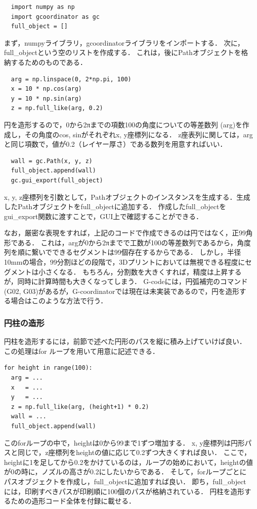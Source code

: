 \documentclass{article}
\begin{document}
\begin{twocolumn}
\begin{lstlisting}
  import numpy as np
  import gcoordinator as gc
  full_object = []
\end{lstlisting}

まず，numpyライブラリ，gcoordinatorライブラリをインポートする．
次に，full\_objectという空のリストを作成する．
これは，後にPathオブジェクトを格納するためのものである．

\begin{lstlisting}
  arg = np.linspace(0, 2*np.pi, 100)
  x = 10 * np.cos(arg)
  y = 10 * np.sin(arg)
  z = np.full_like(arg, 0.2)
\end{lstlisting}

円を造形するので，0から2πまでの項数100の角度についての等差数列
(arg)を作成し，その角度のcos, sinがそれぞれx, y座標列になる．
z座表列に関しては，argと同じ項数で，値が0.2（レイヤー厚さ）である数列を用意すればいい．

\begin{lstlisting}
  wall = gc.Path(x, y, z)
  full_object.append(wall)
  gc.gui_export(full_object)
\end{lstlisting}

x, y, z座標列を引数として，Pathオブジェクトのインスタンスを生成する．生成したPathオブジェクトをfull\_objectに追加する．
作成したfull\_objectをgui\_export関数に渡すことで，GUI上で確認することができる．

なお，厳密な表現をすれば，上記のコードで作成できるのは円ではなく，正99角形である．
これは，argが0から2πまでで工数が100の等差数列であるから，角度列を順に繋いでできるセグメントは99個存在するからである．
しかし，半径10mmの場合，99分割ほどの段階で，3Dプリントにおいては無視できる程度にセグメントは小さくなる．
もちろん，分割数を大きくすれば，精度は上昇するが，同時に計算時間も大きくなってしまう．
G-codeには，円弧補完のコマンド(G02, G03)があるが，G-coordinatorでは現在は未実装であるので，円を造形する場合はこのような方法で行う．

\subsubsection{円柱の造形}
円柱を造形するには，前節で述べた円形のパスを縦に積み上げていけば良い．
この処理はfor ループを用いて用意に記述できる．
\begin{lstlisting}[breaklines=false]
for height in range(100):
  arg = ...
  x   = ...
  y   = ...
  z = np.full_like(arg, (height+1) * 0.2)
  wall = ...
  full_object.append(wall)
\end{lstlisting}
このforループの中で，heightは0から99まで1ずつ増加する．
x, y座標列は円形パスと同じで，z座標列をheightの値に応じて0.2ずつ大きくすれば良い．
ここで，heightに1を足してから0.2をかけているのは，ループの始めにおいて，heightの値が0の時に，ノズルの高さが0.2にしたいからである．
そして，forループごとにパスオブジェクトを作成し，full\_objectに追加すれば良い．
即ち，full\_objectには，印刷すべきパスが印刷順に100個のパスが格納されている．
円柱を造形するための造形コード全体を付録に載せる．


\end{twocolumn}
\end{document}
